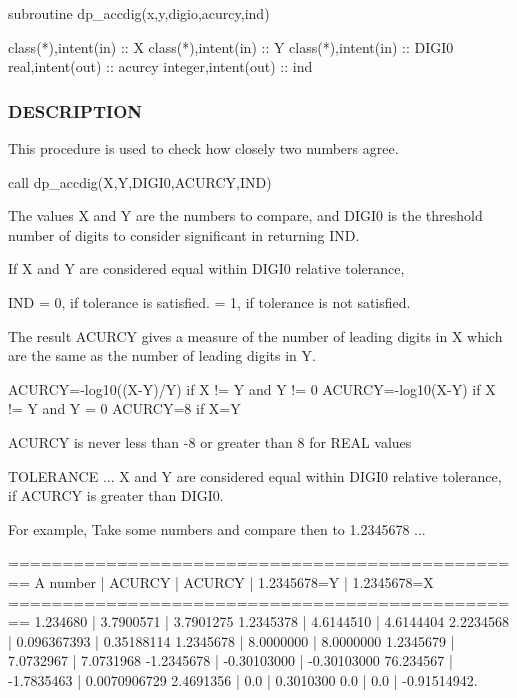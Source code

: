 \begin{DoxyVerb}   subroutine dp_accdig(x,y,digio,acurcy,ind)

    class(*),intent(in)  :: X
    class(*),intent(in)  :: Y
    class(*),intent(in)  :: DIGI0
    real,intent(out)     :: acurcy
    integer,intent(out)  :: ind
\end{DoxyVerb}


\subsubsection*{D\+E\+S\+C\+R\+I\+P\+T\+I\+ON}

\begin{DoxyVerb}This procedure is used to check how closely two numbers agree.

   call dp_accdig(X,Y,DIGI0,ACURCY,IND)

The values X and Y are the numbers to compare, and DIGI0 is the
threshold number of digits to consider significant in returning IND.

If X and Y are considered equal within DIGI0 relative tolerance,

    IND    = 0, if tolerance is     satisfied.
           = 1, if tolerance is not satisfied.

The result ACURCY gives a measure of the number of leading digits in X
which are the same as the number of leading digits in Y.

     ACURCY=-log10((X-Y)/Y)   if X != Y and Y != 0
     ACURCY=-log10(X-Y)       if X != Y and Y = 0
     ACURCY=8                 if X=Y

     ACURCY is never less than -8 or greater than 8 for REAL values

TOLERANCE ...
     X and Y are considered equal within DIGI0 relative tolerance,
     if ACURCY is greater than DIGI0.

For example, Take some numbers and compare then  to 1.2345678 ...

   ================================================
   A number     |    ACURCY       |   ACURCY
                |    1.2345678=Y  |   1.2345678=X
   ================================================
    1.234680    |    3.7900571    |   3.7901275
    1.2345378   |    4.6144510    |   4.6144404
    2.2234568   |    0.096367393  |   0.35188114
    1.2345678   |    8.0000000    |   8.0000000
    1.2345679   |    7.0732967    |   7.0731968
   -1.2345678   |   -0.30103000   |  -0.30103000
   76.234567    |   -1.7835463    |   0.0070906729
    2.4691356   |    0.0          |   0.3010300
    0.0         |    0.0          |  -0.91514942.


\end{DoxyVerb}
